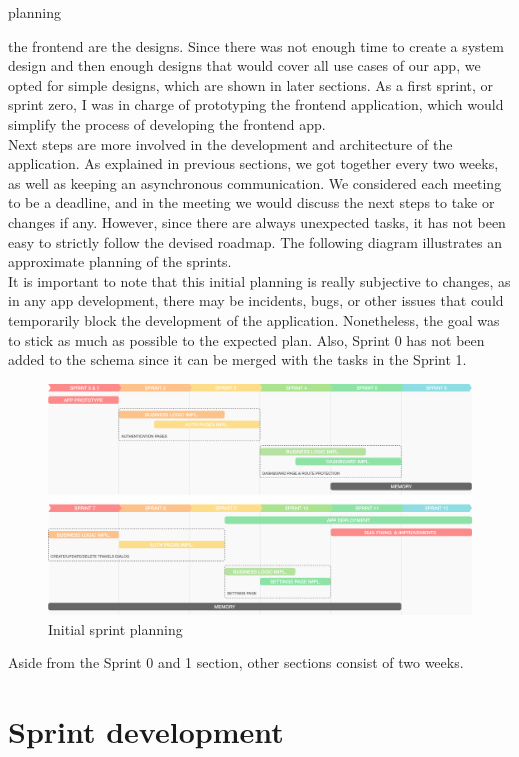 planning\documentclass[../memory.tex]{subfiles}
\begin{document}
the frontend are the designs. Since there was not enough time to create a system
design and then enough designs that would cover all use cases of our app, we
opted for simple designs, which are shown in later sections. As a first sprint,
or sprint zero, I was in charge of prototyping the frontend application, which
would simplify the process of developing the frontend app.
\\[8pt]
Next steps are more involved in the development and architecture of the
application. As explained in previous sections, we got together every two weeks,
as well as keeping an asynchronous communication. We considered each meeting to
be a deadline, and in the meeting we would discuss the next steps to take or
changes if any. However, since there are always unexpected tasks, it has not
been easy to strictly follow the devised roadmap. The following diagram
illustrates an approximate planning of the sprints.
\\
It is important to note that this initial planning is really subjective to
changes, as in any app development, there may be incidents, bugs, or other
issues that could temporarily block the development of the application.
Nonetheless, the goal was to stick as much as possible to the expected plan.
Also, Sprint 0 has not been added to the schema since it can be merged with the
tasks in the Sprint 1.
\begin{figure}[H]
	\centering
	\includegraphics[width=\textwidth]{./assets/roadmap.png}
	\caption{Initial sprint planning}
\end{figure}
Aside from the Sprint 0 and 1 section, other sections consist of two weeks.
\section{Sprint development}
\end{document}
